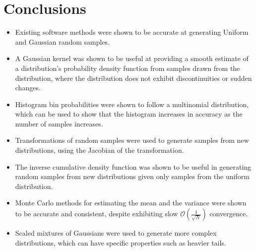 \documentclass[a4paper]{article}
\begin{document}

\section{Conclusions}
\begin{itemize}
    \item Existing software methods were shown to be accurate at generating Uniform and Gaussian random samples.
    \item A Gaussian kernel was shown to be useful at providing a smooth estimate of a distribution's probability
          density function from samples drawn from the distribution, where the distribution does not exhibit
          discontinuities or sudden changes.
    \item Histogram bin probabilities were shown to follow a multinomial distribution, which can be used to show that
          the histogram increases in accuracy as the number of samples increases.
    \item Transformations of random samples were used to generate samples from new distributions, using the Jacobian
          of the transformation.
    \item The inverse cumulative density function was shown to be useful in generating random samples from new
          distributions given only samples from the uniform distribution.
    \item Monte Carlo methods for estimating the mean and the variance were shown to be accurate and consistent, despite
          exhibiting slow $\mathcal{O}\left(\frac{1}{\sqrt{N}}\right)$ convergence.
    \item Scaled mixtures of Gaussians were used to generate more complex distributions, which can have specific
          properties such as heavier tails.

\end{itemize}


\newpage
\appendix
%
\end{document}
